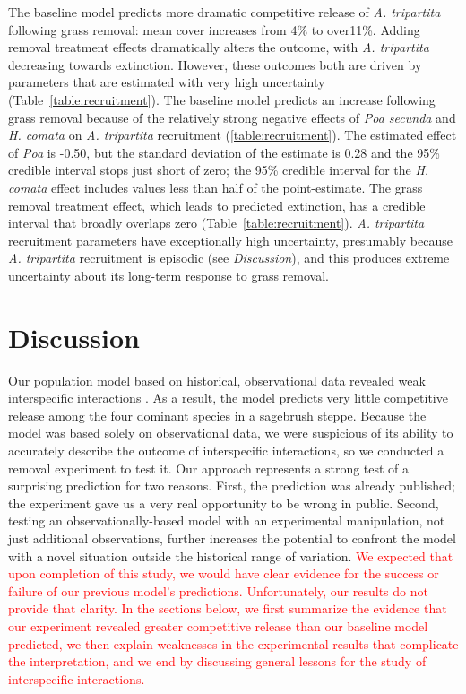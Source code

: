 \documentclass[11pt]{article}
\newcommand{\new}{\textcolor{red}}
\begin{document}
\begin{doublespacing}
The baseline model predicts more dramatic competitive release of \textit{A. tripartita} following grass removal: mean cover increases from 4\% to over11\%. 
Adding removal treatment effects dramatically alters the outcome, with \textit{A. tripartita} decreasing towards extinction. However, these outcomes both are driven by parameters that are estimated with very high uncertainty (Table~\ref{table:recruitment}). The baseline model predicts an increase following grass removal because of the relatively strong negative effects of \textit{Poa secunda} and \textit{H. comata} on \textit{A. tripartita} recruitment (\ref{table:recruitment}). The estimated effect of
\emph{Poa} is -0.50, but the standard deviation of the estimate is 0.28 and the 95\% credible interval stops just short of zero; the 95\% credible interval for the
\textit{H. comata} effect includes values less than half of the point-estimate. The grass removal treatment effect, which leads to predicted extinction, has a credible 
interval that broadly overlaps zero (Table~\ref{table:recruitment}). \textit{A. tripartita} recruitment parameters have exceptionally high uncertainty, presumably 
because \textit{A. tripartita} recruitment is episodic (see \emph{Discussion}), and this produces extreme uncertainty about its long-term 
response to grass removal.

\section*{Discussion}

Our population model based on historical, observational data revealed weak interspecific interactions \citep{adler_coexistence_2010,chu_large_2015}. As a result, the model predicts very little competitive release among the four dominant species in a sagebrush steppe. 
Because the model was based solely on observational
data, we were suspicious of its ability to accurately describe the outcome of interspecific interactions, so we conducted a removal experiment to test it. 
Our approach represents a strong test of a surprising prediction for two reasons. First, the prediction was already published; the experiment 
gave us a very real opportunity to be wrong in public. Second, testing an observationally-based model with an experimental manipulation, 
not just additional observations, further increases the potential to confront the model with a novel situation outside the historical range of variation.
\new{We expected that upon completion of this study, we would have clear evidence for the success or failure of our previous model's predictions. Unfortunately, our results do not provide that clarity. In the sections below, we first summarize the evidence that our experiment revealed greater competitive release than our baseline model predicted, we then explain weaknesses in the experimental results that complicate the interpretation, and we end by discussing general lessons for the study of interspecific interactions.}


\end{doublespacing}
\end{document}
